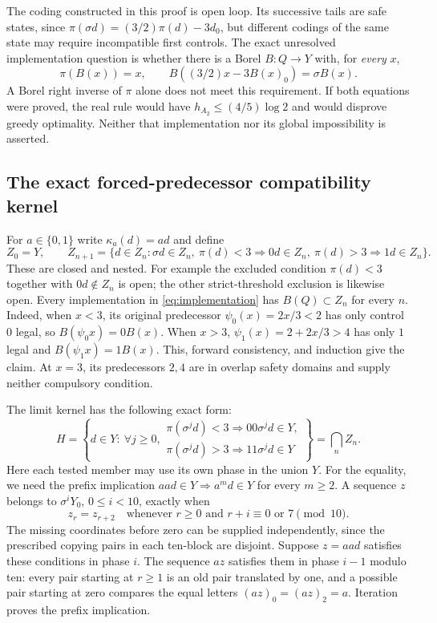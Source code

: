 \documentclass[11pt,reqno]{amsart}
\numberwithin{equation}{section}
\theoremstyle{definition}
\begin{document}
The coding constructed in this proof is open loop. Its successive
tails are safe states, since
$\pi(\sigma d)=(3/2)\pi(d)-3d_0$, but different codings
of the same state may require incompatible first controls.
The exact unresolved implementation question is whether there is
a Borel $B:Q\to Y$ with, for \emph{every} $x$,
\begin{equation}\label{eq:implementation}
 \pi(B(x))=x,\qquad
 B((3/2)x-3B(x)_0)=\sigma B(x).
\end{equation}
A Borel right inverse of $\pi$ alone does not meet this requirement.
If both equations were proved, the real rule would have
$h_{A_2}\le(4/5)\log2$ and would disprove greedy optimality.
Neither that implementation nor its global impossibility is asserted.

\subsection{The exact forced-predecessor compatibility kernel}
For $a\in\{0,1\}$ write $\kappa_a(d)=ad$ and define
\[
 Z_0=Y,\qquad Z_{n+1}=\{d\in Z_n:\sigma d\in Z_n,
 \ \pi(d)<3\Rightarrow0d\in Z_n,
 \ \pi(d)>3\Rightarrow1d\in Z_n\}.
\]
These are closed and nested. For example the excluded condition
$\pi(d)<3$ together with $0d\notin Z_n$ is open; the other
strict-threshold exclusion is likewise open.
Every implementation in \eqref{eq:implementation} has
$B(Q)\subset Z_n$ for every $n$. Indeed, when $x<3$,
its original predecessor $\psi_0(x)=2x/3<2$ has only control
$0$ legal, so $B(\psi_0x)=0B(x)$. When $x>3$,
$\psi_1(x)=2+2x/3>4$ has only $1$ legal and
$B(\psi_1x)=1B(x)$. This, forward consistency, and induction
give the claim. At $x=3$, its predecessors $2,4$ are in
overlap safety domains and supply neither compulsory condition.

The limit kernel has the following exact form:
\begin{equation}\label{eq:kernel-H}
 H=\left\{d\in Y:\ \forall j\ge0,
 \begin{array}{l}
 \pi(\sigma^jd)<3\Rightarrow00\sigma^jd\in Y,\\
 \pi(\sigma^jd)>3\Rightarrow11\sigma^jd\in Y
 \end{array}\right\}=\bigcap_nZ_n.
\end{equation}
Here each tested member may use its own phase in the union $Y$.
For the equality, we need the prefix implication
$aa d\in Y\Rightarrow a^m d\in Y$ for every $m\ge2$.
A sequence $z$ belongs to $\sigma^iY_0$, $0\le i<10$, exactly when
\[
 z_r=z_{r+2}\quad\text{whenever }r\ge0
       \text{ and }r+i\equiv0\text{ or }7\pmod {10}.
\]
The missing coordinates before zero can be supplied independently,
since the prescribed copying pairs in each ten-block are disjoint.
Suppose $z=aa d$ satisfies these conditions in phase $i$.
The sequence $az$ satisfies them in phase $i-1$ modulo ten:
every pair starting at $r\ge1$ is an old pair translated by one,
and a possible pair starting at zero compares the equal letters
$(az)_0=(az)_2=a$. Iteration proves the prefix implication.
\end{document}
